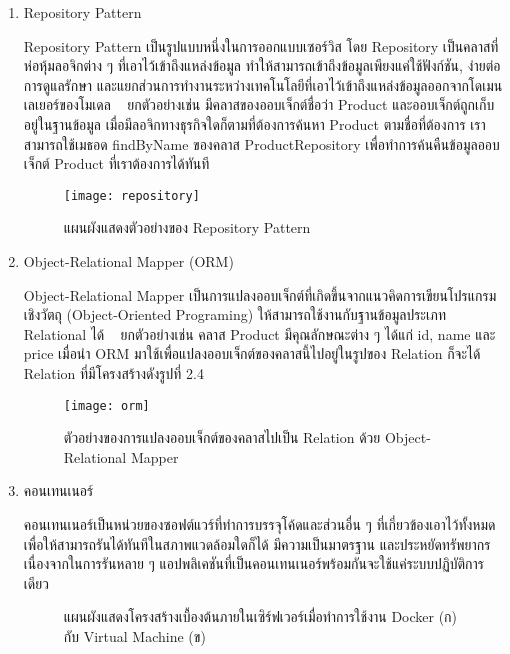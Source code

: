 \begin{enumerate}
	\item Repository Pattern
	
	Repository Pattern เป็นรูปแบบหนึ่งในการออกแบบเซอร์วิส โดย Repository เป็นคลาสที่ห่อหุ้มลอจิกต่าง ๆ ที่เอาไว้เข้าถึงแหล่งข้อมูล ทำให้สามารถเข้าถึงข้อมูลเพียงแค่ใช้ฟังก์ชัน, ง่ายต่อการดูแลรักษา และแยกส่วนการทำงานระหว่างเทคโนโลยีที่เอาไว้เข้าถึงแหล่งข้อมูลออกจากโดเมนเลเยอร์ของโมเดล ~\cite{repository} ยกตัวอย่างเช่น มีคลาสของออบเจ็กต์ชื่อว่า Product และออบเจ็กต์ถูกเก็บอยู่ในฐานข้อมูล เมื่อมีลอจิกทางธุรกิจใดก็ตามที่ต้องการค้นหา Product ตามชื่อที่ต้องการ เราสามารถใช้เมธอด findByName ของคลาส ProductRepository เพื่อทำการค้นคืนข้อมูลออบเจ็กต์ Product ที่เราต้องการได้ทันที
	
	\begin{figure}[!h]
		\centering
		\texttt{[image: repository]}  
		\caption{แผนผังแสดงตัวอย่างของ Repository Pattern}
		\label{Fig:repository}
	\end{figure}
	
	\item Object-Relational Mapper (ORM)
	
	Object-Relational Mapper เป็นการแปลงออบเจ็กต์ที่เกิดขึ้นจากแนวคิดการเขียนโปรแกรมเชิงวัตถุ (Object-Oriented Programing) ให้สามารถใช้งานกับฐานข้อมูลประเภท Relational ได้ ~\cite{orm} ยกตัวอย่างเช่น คลาส Product มีคุณลักษณะต่าง ๆ ได้แก่ id, name และ price เมื่อนำ ORM มาใช้เพื่อแปลงออบเจ็กต์ของคลาสนี้ไปอยู่ในรูปของ Relation ก็จะได้ Relation ที่มีโครงสร้างดังรูปที่ 2.4
	
	\begin{figure}[!h]
		\centering
		\texttt{[image: orm]}  
		\caption{ตัวอย่างของการแปลงออบเจ็กต์ของคลาสไปเป็น Relation ด้วย Object-Relational Mapper}
		\label{Fig:orm}
	\end{figure}
	
	\item คอนเทนเนอร์
	
	คอนเทนเนอร์เป็นหน่วยของซอฟต์แวร์ที่ทำการบรรจุโค้ดและส่วนอื่น ๆ ที่เกี่ยวข้องเอาไว้ทั้งหมดเพื่อให้สามารถรันได้ทันทีในสภาพแวดล้อมใดก็ได้ มีความเป็นมาตรฐาน และประหยัดทรัพยากร เนื่องจากในการรันหลาย ๆ แอปพลิเคชันที่เป็นคอนเทนเนอร์พร้อมกันจะใช้แค่ระบบปฏิบัติการเดียว
	
	\begin{figure}[!h]
		\centering
		\caption{แผนผังแสดงโครงสร้างเบื้องต้นภายในเซิร์ฟเวอร์เมื่อทำการใช้งาน Docker (ก) กับ Virtual Machine (ข)}
		\label{Fig:infra}
	\end{figure}


\end{enumerate}
